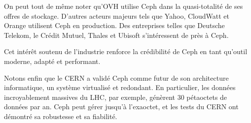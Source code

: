 On peut tout de même noter qu'OVH utilise Ceph dans la quasi-totalité de ses offres de stockage. D'autres acteurs majeurs tels que Yahoo, CloudWatt et Orange utilisent Ceph en production. Des entreprises telles que Deutsche Telekom, le Crédit Mutuel, Thales et Ubisoft s'intéressent de près à Ceph.

Cet intérêt soutenu de l'industrie renforce la crédibilité de Ceph en tant qu'outil moderne, adapté et performant.

Notons enfin que le CERN a validé Ceph comme futur de son architecture informatique, un système virtualisé et redondant. En particulier, les données incroyablement massives du LHC, par exemple, génèrent 30 pétaoctets de données par an. Ceph peut gérer jusqu'à l'exaoctet, et les tests du CERN ont démontré sa robustesse et sa fiabilité.
